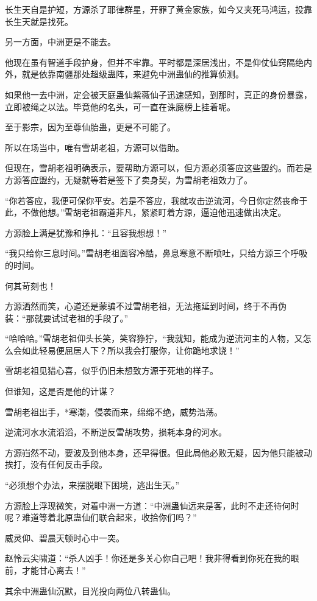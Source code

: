 \begin{this_body}
长生天自是护短，方源杀了耶律群星，开罪了黄金家族，如今又夹死马鸿运，投靠长生天就是找死。

另一方面，中洲更是不能去。

他现在虽有智道手段护身，但并不牢靠。平时都是深居浅出，不是仰仗仙窍隔绝内外，就是依靠南疆那处超级蛊阵，来避免中洲蛊仙的推算侦测。

如果他一去中洲，定会被天庭蛊仙紫薇仙子迅速感知，到那时，真正的身份暴露，立即被绳之以法。毕竟他的名头，可一直在诛魔榜上挂着呢。

至于影宗，因为至尊仙胎蛊，更是不可能了。

所以在场当中，唯有雪胡老祖，方源可以借助。

但现在，雪胡老祖明确表示，要帮助方源可以，但方源必须答应这些盟约。而若是方源答应盟约，无疑就等若是签下了卖身契，为雪胡老祖效力了。

“你若答应，我便可保你平安。若是不答应，我就攻击逆流河，今日你定然丧命于此，不做他想。”雪胡老祖霸道非凡，紧紧盯着方源，逼迫他迅速做出决定。

方源脸上满是犹豫和挣扎：“且容我想想！”

“我只给你三息时间。”雪胡老祖面容冷酷，鼻息寒意不断喷吐，只给方源三个呼吸的时间。

何其苛刻也！

方源洒然而笑，心道还是蒙骗不过雪胡老祖，无法拖延到时间，终于不再伪装：“那就要试试老祖的手段了。”

“哈哈哈。”雪胡老祖仰头长笑，笑容狰狞，“我就知，能成为逆流河主的人物，又怎么会如此轻易便屈居人下？所以我会打服你，让你跪地求饶！”

雪胡老祖见猎心喜，似乎仍旧未想致方源于死地的样子。

但谁知，这是否是他的计谋？

雪胡老祖出手，*寒潮，侵袭而来，绵绵不绝，威势浩荡。

逆流河水水流滔滔，不断逆反雪胡攻势，损耗本身的河水。

方源岿然不动，要波及到他本身，还早得很。但此局他必败无疑，因为他只能被动挨打，没有任何反击手段。

“必须想个办法，来摆脱眼下困境，逃出生天。”

方源脸上浮现微笑，对着中洲一方道：“中洲蛊仙远来是客，此时不走还待何时呢？难道等着北原蛊仙们联合起来，收拾你们吗？”

威灵仰、碧晨天顿时心中一突。

赵怜云尖啸道：“杀人凶手！你还是多关心你自己吧！我非得看到你死在我的眼前，才能甘心离去！”

其余中洲蛊仙沉默，目光投向两位八转蛊仙。


\end{this_body}
